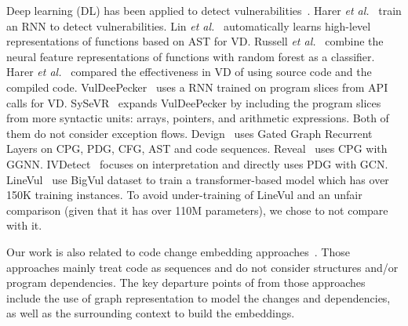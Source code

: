 Deep learning (DL) has been applied
to detect
vulnerabilities~\cite{li2021vulnerability,zhou2019devign,li2021vuldeelocator,li2020automated,chakraborty2021deep,hin2022linevd,scandariato2014predicting,neuhaus2007predicting,shin2010evaluating,neuhaus2009beauty,yamaguchi2012generalized,yamaguchi2011vulnerability}.
Harer {\em et al.}~\cite{harer2018learning} train an RNN to detect
vulnerabilities. Lin {\em et al.}~\cite{lin2017poster} automatically
learns high-level representations of functions based on AST for
VD. Russell {\em et al.}~\cite{russell2018automated} combine the
neural feature representations of functions with random forest as a
classifier.
Harer {\em et al.}~\cite{harer2018automated} compared the
effectiveness in VD of using source code and the compiled
code. VulDeePecker~\cite{li2018vuldeepecker} uses a RNN trained on
program slices from API calls for VD. SySeVR~\cite{li2021sysevr}
expands VulDeePecker by including the program slices from more
syntactic units: arrays, pointers, and arithmetic expressions. Both of
them do not consider exception flows. Devign~\cite{zhou2019devign}
uses Gated Graph Recurrent Layers on CPG, PDG, CFG, AST and code
sequences. Reveal~\cite{chakraborty2020deep} uses CPG with
GGNN. IVDetect~\cite{li2021vulnerability} focuses on interpretation and directly
uses PDG with GCN. LineVul~\cite{linevul-msr22} use BigVul dataset to
train a transformer-based model which has over 150K training
instances. To avoid under-training of LineVul and an unfair comparison
(given that it has over 110M parameters), we chose to not compare with
it.

Our work is also related to code change embedding
approaches~\cite{cc2vec,commit2vec}. Those approaches mainly treat
code as sequences and do not consider structures and/or program
dependencies. The key departure points of {\tool} from those
approaches include the use of graph representation to model the
changes and dependencies, as well as the surrounding context to build
the embeddings.






